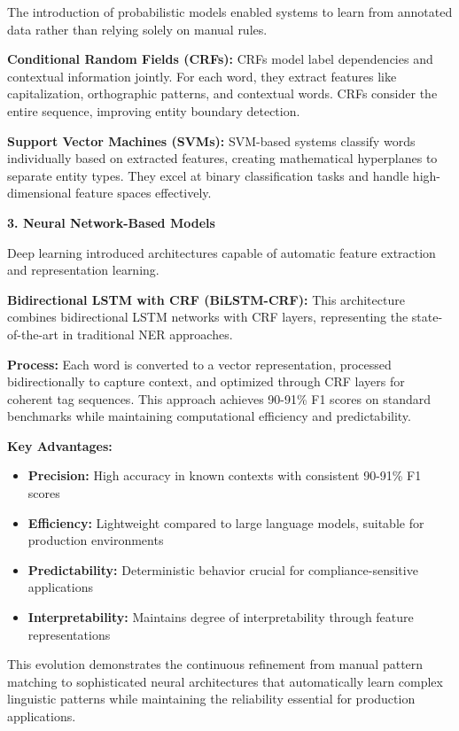 \documentclass[12pt,a4paper]{article}
\begin{document}
The introduction of probabilistic models enabled systems to learn from annotated data rather than relying solely on manual rules.

\textbf{Conditional Random Fields (CRFs):} CRFs model label dependencies and contextual information jointly. For each word, they extract features like capitalization, orthographic patterns, and contextual words. CRFs consider the entire sequence, improving entity boundary detection.

\textbf{Support Vector Machines (SVMs):} SVM-based systems classify words individually based on extracted features, creating mathematical hyperplanes to separate entity types. They excel at binary classification tasks and handle high-dimensional feature spaces effectively.

\textbf{3. Neural Network-Based Models}

Deep learning introduced architectures capable of automatic feature extraction and representation learning.

\textbf{Bidirectional LSTM with CRF (BiLSTM-CRF):} This architecture combines bidirectional LSTM networks with CRF layers, representing the state-of-the-art in traditional NER approaches.

\textbf{Process:} Each word is converted to a vector representation, processed bidirectionally to capture context, and optimized through CRF layers for coherent tag sequences. This approach achieves 90-91\% F1 scores on standard benchmarks while maintaining computational efficiency and predictability.

\textbf{Key Advantages:}
\begin{itemize}
  \item \textbf{Precision:} High accuracy in known contexts with consistent 90-91\% F1 scores
  \item \textbf{Efficiency:} Lightweight compared to large language models, suitable for production environments
  \item \textbf{Predictability:} Deterministic behavior crucial for compliance-sensitive applications
  \item \textbf{Interpretability:} Maintains degree of interpretability through feature representations
\end{itemize}

This evolution demonstrates the continuous refinement from manual pattern matching to sophisticated neural architectures that automatically learn complex linguistic patterns while maintaining the reliability essential for production applications.
\end{document}
